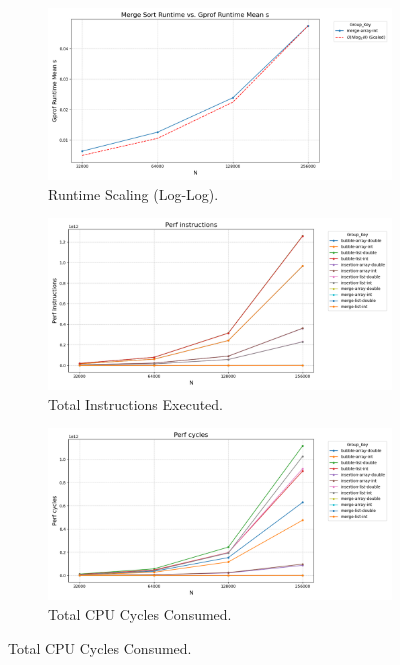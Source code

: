 \documentclass[11pt, a4paper]{article}
\begin{document}
\begin{figure}[h]
    \centering
    \begin{subfigure}[b]{0.32\textwidth}
        \centering
        \includegraphics[width=\textwidth]{plots/complexity_runtime_runtime.png}
        \caption{Runtime Scaling (Log-Log).}
        \label{fig:app_sub_runtime_loglog}
    \end{subfigure}
    \hfill
    \begin{subfigure}[b]{0.32\textwidth}
        \centering
        \includegraphics[width=\textwidth]{plots/_instructions.png}
        \caption{Total Instructions Executed.}
        \label{fig:app_sub_instructions}
    \end{subfigure}
    \hfill
    \begin{subfigure}[b]{0.32\textwidth}
        \centering
        \includegraphics[width=\textwidth]{plots/_cycles.png}
        \caption{Total CPU Cycles Consumed.}
        \label{fig:app_sub_cycles}
    \end{subfigure}


\end{figure}
\end{document}
